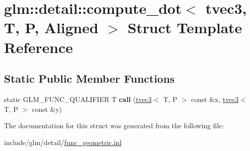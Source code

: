 \hypertarget{structglm_1_1detail_1_1compute__dot_3_01tvec3_00_01T_00_01P_00_01Aligned_01_4}{}\section{glm\+:\+:detail\+:\+:compute\+\_\+dot$<$ tvec3, T, P, Aligned $>$ Struct Template Reference}
\label{structglm_1_1detail_1_1compute__dot_3_01tvec3_00_01T_00_01P_00_01Aligned_01_4}
\subsection*{Static Public Member Functions}
\begin{DoxyCompactItemize}
\item 
\mbox{\label{structglm_1_1detail_1_1compute__dot_3_01tvec3_00_01T_00_01P_00_01Aligned_01_4_a319c4ec41a2c4fd3a22fe9467ae557da}} 
static G\+L\+M\+\_\+\+F\+U\+N\+C\+\_\+\+Q\+U\+A\+L\+I\+F\+I\+ER T {\bfseries call} (\hyperlink{structglm_1_1tvec3}{tvec3}$<$ T, P $>$ const \&x, \hyperlink{structglm_1_1tvec3}{tvec3}$<$ T, P $>$ const \&y)
\end{DoxyCompactItemize}


The documentation for this struct was generated from the following file\+:\begin{DoxyCompactItemize}
\item 
include/glm/detail/\hyperlink{func__geometric_8inl}{func\+\_\+geometric.\+inl}\end{DoxyCompactItemize}
